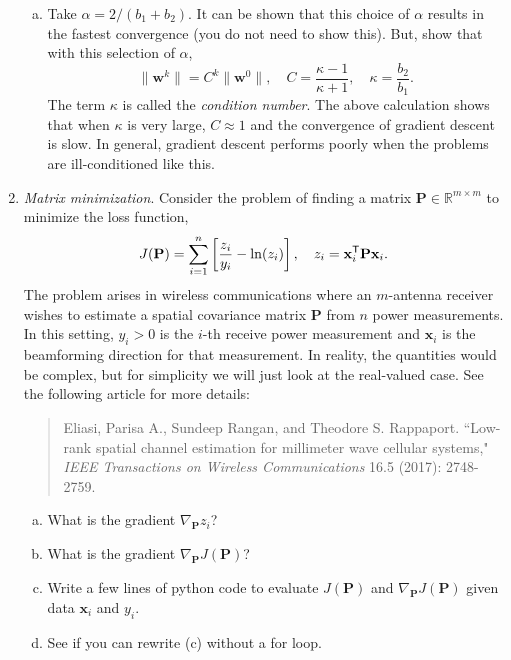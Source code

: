 \documentclass[11pt]{article}
\def\R{{\mathbb{R}}}
\def\x{\times}
\newcommand{\wbf}{\mathbf{w}}
\newcommand{\xbf}{\mathbf{x}}
\newcommand{\Pbf}{\mathbf{P}}
\newcommand{\tran}{^{\text{\sf T}}}
\begin{document}
\begin{enumerate}
\begin{enumerate}[(a)]
\item Take $\alpha = 2/(b_1+b_2)$.  It can be shown that this choice of $\alpha$ results in the fastest convergence (you do not need to show this).  
But, show that with this selection of $\alpha$,
\[
    \|\wbf^k\| = C^k \|\wbf^0\|, \quad C = \frac{\kappa-1}{\kappa+1 }, \quad
    \kappa = \frac{b_2}{b_1}.
\]
The term $\kappa$ is called the \emph{condition number}.  The above calculation
shows that when $\kappa$ is very large, $C \approx 1$ and the convergence
of gradient descent is slow.  In general, gradient descent performs poorly
when the problems are ill-conditioned like this.
\end{enumerate}

\item \emph{Matrix minimization}.  Consider the problem of finding a matrix 
$\Pbf \in \R^{m \x m}$ to minimize the loss function,
\[
    J(\Pbf) = \sum_{i=1}^n \left[ \frac{z_i}{y_i} - \ln(z_i) \right], 
    \quad
    z_i = \xbf_i\tran \Pbf \xbf_i.
\]
The problem arises in wireless communications where an $m$-antenna receiver wishes
to estimate a spatial covariance matrix $\Pbf$ from $n$ power measurements.
In this setting, $y_i > 0$ is the $i$-th receive power measurement and $\xbf_i$
is the beamforming direction for that measurement.  In reality, the quantities
would be complex, but for simplicity we will just look at the real-valued case.
See the following article for more details:
\begin{quote}
  Eliasi, Parisa A., Sundeep Rangan, and Theodore S. Rappaport. ``Low-rank spatial channel estimation for millimeter wave cellular systems," \emph{IEEE Transactions on Wireless Communications} 16.5 (2017): 2748-2759.
\end{quote}
\begin{enumerate}[(a)]
\item What is the gradient $\nabla_{\Pbf} z_i$?

\item What is the gradient $\nabla_{\Pbf} J(\Pbf)$?

\item Write a few lines of python code to evaluate $J(\Pbf)$ and
$\nabla_{\Pbf} J(\Pbf)$ given data $\xbf_i$ and $y_i$.  

\item See if you can rewrite (c) without a for loop.  
\end{enumerate}


\end{enumerate}
\end{document}
